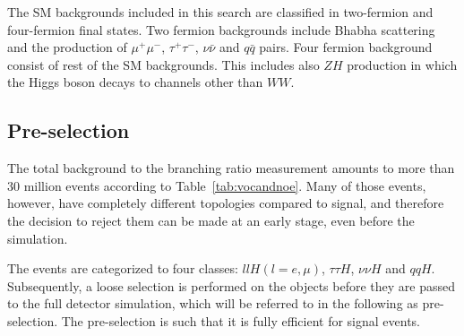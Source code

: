 \documentclass[11pt,a4paper]{cepcnote}
\begin{document}
The SM backgrounds included in this search are classified in two-fermion and four-fermion final states.
Two fermion backgrounds include  Bhabha scattering and the production of $\mu^+\mu^-$, $\tau^+\tau^-$, $\nu\bar{\nu}$ and $q\bar{q}$ pairs.
Four fermion background consist of rest of the SM backgrounds.
This includes also $ZH$ production in which the Higgs boson decays to channels other than $WW$.

\subsection{Pre-selection}
The total background to the branching ratio measurement amounts to more than 30 million events according to Table~\ref{tab:vocandnoe}.
Many of those events, however, have completely different topologies compared to signal, and therefore
the decision to reject them can be made at an early stage, even before the simulation.

The events are categorized to four classes: $llH(l=e,\mu)$, $\tau\tau H$, 
$\nu\nu H$ and $qqH$. Subsequently,  a loose selection is performed on the objects
before they are passed to the full detector simulation, which will be referred to in the
following as pre-selection. The pre-selection is such that it is fully efficient for
signal events.
\end{document}
